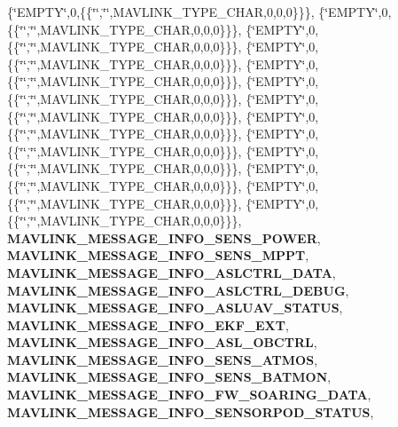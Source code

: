 \begin{DoxyCompactItemize}
\{\char`\"{}E\+M\+P\+TY\char`\"{},0,\{\{\char`\"{}\char`\"{},\char`\"{}\char`\"{},M\+A\+V\+L\+I\+N\+K\+\_\+\+T\+Y\+P\+E\+\_\+\+C\+H\+AR,0,0,0\}\}\}, \{\char`\"{}E\+M\+P\+TY\char`\"{},0,\{\{\char`\"{}\char`\"{},\char`\"{}\char`\"{},M\+A\+V\+L\+I\+N\+K\+\_\+\+T\+Y\+P\+E\+\_\+\+C\+H\+AR,0,0,0\}\}\}, \{\char`\"{}E\+M\+P\+TY\char`\"{},0,\{\{\char`\"{}\char`\"{},\char`\"{}\char`\"{},M\+A\+V\+L\+I\+N\+K\+\_\+\+T\+Y\+P\+E\+\_\+\+C\+H\+AR,0,0,0\}\}\}, \{\char`\"{}E\+M\+P\+TY\char`\"{},0,\{\{\char`\"{}\char`\"{},\char`\"{}\char`\"{},M\+A\+V\+L\+I\+N\+K\+\_\+\+T\+Y\+P\+E\+\_\+\+C\+H\+AR,0,0,0\}\}\}, \{\char`\"{}E\+M\+P\+TY\char`\"{},0,\{\{\char`\"{}\char`\"{},\char`\"{}\char`\"{},M\+A\+V\+L\+I\+N\+K\+\_\+\+T\+Y\+P\+E\+\_\+\+C\+H\+AR,0,0,0\}\}\}, \{\char`\"{}E\+M\+P\+TY\char`\"{},0,\{\{\char`\"{}\char`\"{},\char`\"{}\char`\"{},M\+A\+V\+L\+I\+N\+K\+\_\+\+T\+Y\+P\+E\+\_\+\+C\+H\+AR,0,0,0\}\}\}, \{\char`\"{}E\+M\+P\+TY\char`\"{},0,\{\{\char`\"{}\char`\"{},\char`\"{}\char`\"{},M\+A\+V\+L\+I\+N\+K\+\_\+\+T\+Y\+P\+E\+\_\+\+C\+H\+AR,0,0,0\}\}\}, \{\char`\"{}E\+M\+P\+TY\char`\"{},0,\{\{\char`\"{}\char`\"{},\char`\"{}\char`\"{},M\+A\+V\+L\+I\+N\+K\+\_\+\+T\+Y\+P\+E\+\_\+\+C\+H\+AR,0,0,0\}\}\}, \{\char`\"{}E\+M\+P\+TY\char`\"{},0,\{\{\char`\"{}\char`\"{},\char`\"{}\char`\"{},M\+A\+V\+L\+I\+N\+K\+\_\+\+T\+Y\+P\+E\+\_\+\+C\+H\+AR,0,0,0\}\}\}, \{\char`\"{}E\+M\+P\+TY\char`\"{},0,\{\{\char`\"{}\char`\"{},\char`\"{}\char`\"{},M\+A\+V\+L\+I\+N\+K\+\_\+\+T\+Y\+P\+E\+\_\+\+C\+H\+AR,0,0,0\}\}\}, \{\char`\"{}E\+M\+P\+TY\char`\"{},0,\{\{\char`\"{}\char`\"{},\char`\"{}\char`\"{},M\+A\+V\+L\+I\+N\+K\+\_\+\+T\+Y\+P\+E\+\_\+\+C\+H\+AR,0,0,0\}\}\}, \{\char`\"{}E\+M\+P\+TY\char`\"{},0,\{\{\char`\"{}\char`\"{},\char`\"{}\char`\"{},M\+A\+V\+L\+I\+N\+K\+\_\+\+T\+Y\+P\+E\+\_\+\+C\+H\+AR,0,0,0\}\}\}, \{\char`\"{}E\+M\+P\+TY\char`\"{},0,\{\{\char`\"{}\char`\"{},\char`\"{}\char`\"{},M\+A\+V\+L\+I\+N\+K\+\_\+\+T\+Y\+P\+E\+\_\+\+C\+H\+AR,0,0,0\}\}\}, \textbf{ M\+A\+V\+L\+I\+N\+K\+\_\+\+M\+E\+S\+S\+A\+G\+E\+\_\+\+I\+N\+F\+O\+\_\+\+S\+E\+N\+S\+\_\+\+P\+O\+W\+ER}, \textbf{ M\+A\+V\+L\+I\+N\+K\+\_\+\+M\+E\+S\+S\+A\+G\+E\+\_\+\+I\+N\+F\+O\+\_\+\+S\+E\+N\+S\+\_\+\+M\+P\+PT}, \textbf{ M\+A\+V\+L\+I\+N\+K\+\_\+\+M\+E\+S\+S\+A\+G\+E\+\_\+\+I\+N\+F\+O\+\_\+\+A\+S\+L\+C\+T\+R\+L\+\_\+\+D\+A\+TA}, \textbf{ M\+A\+V\+L\+I\+N\+K\+\_\+\+M\+E\+S\+S\+A\+G\+E\+\_\+\+I\+N\+F\+O\+\_\+\+A\+S\+L\+C\+T\+R\+L\+\_\+\+D\+E\+B\+UG}, \textbf{ M\+A\+V\+L\+I\+N\+K\+\_\+\+M\+E\+S\+S\+A\+G\+E\+\_\+\+I\+N\+F\+O\+\_\+\+A\+S\+L\+U\+A\+V\+\_\+\+S\+T\+A\+T\+US}, \textbf{ M\+A\+V\+L\+I\+N\+K\+\_\+\+M\+E\+S\+S\+A\+G\+E\+\_\+\+I\+N\+F\+O\+\_\+\+E\+K\+F\+\_\+\+E\+XT}, \textbf{ M\+A\+V\+L\+I\+N\+K\+\_\+\+M\+E\+S\+S\+A\+G\+E\+\_\+\+I\+N\+F\+O\+\_\+\+A\+S\+L\+\_\+\+O\+B\+C\+T\+RL}, \textbf{ M\+A\+V\+L\+I\+N\+K\+\_\+\+M\+E\+S\+S\+A\+G\+E\+\_\+\+I\+N\+F\+O\+\_\+\+S\+E\+N\+S\+\_\+\+A\+T\+M\+OS}, \textbf{ M\+A\+V\+L\+I\+N\+K\+\_\+\+M\+E\+S\+S\+A\+G\+E\+\_\+\+I\+N\+F\+O\+\_\+\+S\+E\+N\+S\+\_\+\+B\+A\+T\+M\+ON}, \textbf{ M\+A\+V\+L\+I\+N\+K\+\_\+\+M\+E\+S\+S\+A\+G\+E\+\_\+\+I\+N\+F\+O\+\_\+\+F\+W\+\_\+\+S\+O\+A\+R\+I\+N\+G\+\_\+\+D\+A\+TA}, \textbf{ M\+A\+V\+L\+I\+N\+K\+\_\+\+M\+E\+S\+S\+A\+G\+E\+\_\+\+I\+N\+F\+O\+\_\+\+S\+E\+N\+S\+O\+R\+P\+O\+D\+\_\+\+S\+T\+A\+T\+US}, 
\end{DoxyCompactItemize}
